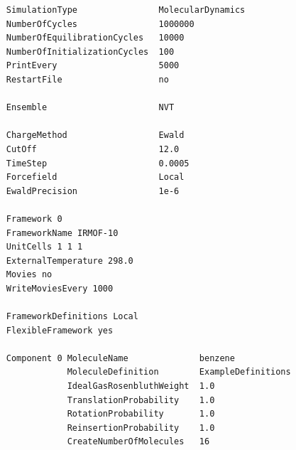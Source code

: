 \begin{tiny}
\begin{verbatim}
     SimulationType                MolecularDynamics
     NumberOfCycles                1000000
     NumberOfEquilibrationCycles   10000
     NumberOfInitializationCycles  100
     PrintEvery                    5000
     RestartFile                   no
     
     Ensemble                      NVT
     
     ChargeMethod                  Ewald
     CutOff                        12.0
     TimeStep                      0.0005
     Forcefield                    Local
     EwaldPrecision                1e-6
     
     Framework 0
     FrameworkName IRMOF-10
     UnitCells 1 1 1
     ExternalTemperature 298.0
     Movies no
     WriteMoviesEvery 1000
     
     FrameworkDefinitions Local
     FlexibleFramework yes
     
     Component 0 MoleculeName              benzene
                 MoleculeDefinition        ExampleDefinitions
                 IdealGasRosenbluthWeight  1.0
                 TranslationProbability    1.0
                 RotationProbability       1.0
                 ReinsertionProbability    1.0
                 CreateNumberOfMolecules   16
\end{verbatim}
\end{tiny}

